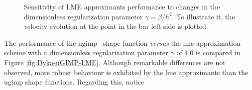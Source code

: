 \documentclass[preprint,12pt,a4paper]{elsarticle}
\begin{document}
\begin{figure}\sidecaption
  \centering
  \caption{Sensitivity  of LME approximants performance to changes in the
    dimensionless regularization parameter $\gamma = \beta/h^2$. To
    illustrate it, the velocity evolution at the point in the bar left side
    is plotted.}
  \label{fig:Dyka-LME-gamma}
\end{figure}
The performance of the
\acrshort{ugimp}~\cite{Bardenhagen2004} shape function \textit{versus} the \acrshort{lme} approximation scheme with
a dimensionless regularization parameter $\gamma$ of 4.0 is compared in Figure \ref{fig:Dyka-uGIMP-LME}. Although remarkable differences are not observed, more
robust behaviour is exhibited by the \acrshort{lme} approximants than the \acrshort{ugimp} shape functions. Regarding this, notice
\end{document}

